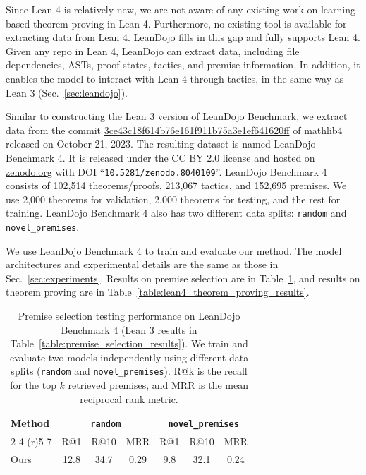 \documentclass{article}
\begin{document}
Since Lean 4 is relatively new, we are not aware of any existing work on learning-based theorem proving in Lean 4. Furthermore, no existing tool is available for extracting data from Lean 4. LeanDojo fills in this gap and fully supports Lean 4. Given any repo in Lean 4, LeanDojo can extract data, including file dependencies, ASTs, proof states, tactics, and premise information. In addition, it enables the model to interact with Lean 4 through tactics, in the same way as Lean 3 (Sec.~\ref{sec:leandojo}). 

Similar to constructing the Lean 3 version of LeanDojo Benchmark, we extract data from the commit \href{https://github.com/leanprover-community/mathlib4/commit/3ce43c18f614b76e161f911b75a3e1ef641620ff}{3ce43c18f614b76e161f911b75a3e1ef641620ff} of mathlib4 released on October 21, 2023. The resulting dataset is named LeanDojo Benchmark 4. It is released under the CC BY 2.0 license and hosted on \href{https://zenodo.org/}{zenodo.org} with DOI ``\texttt{10.5281/zenodo.8040109}''. LeanDojo Benchmark 4 consists of 102,514 theorems/proofs, 213,067 tactics, and 152,695 premises. We use 2,000 theorems for validation, 2,000 theorems for testing, and the rest for training. LeanDojo Benchmark 4 also has two different data splits: \texttt{random} and \texttt{novel\_premises}.

We use LeanDojo Benchmark 4 to train and evaluate our method. The model architectures and experimental details are the same as those in Sec.~\ref{sec:experiments}. Results on premise selection are in Table~\ref{table:lean4_premise_selection_results}, and results on theorem proving are in Table~\ref{table:lean4_theorem_proving_results}. 



\begin{table}[ht]
  \centering
  \caption{Premise selection testing performance on LeanDojo Benchmark 4 (Lean 3 results in  Table~\ref{table:premise_selection_results}). We train and evaluate two models independently using different data splits (\texttt{random} and \texttt{novel\_premises}). R@k is the recall for the top $k$ retrieved premises, and MRR is the mean reciprocal rank metric.}
  \begin{tabular}{@{}lcccccc@{}}
    \toprule
     Method & \multicolumn{3}{c}{\texttt{random}} & \multicolumn{3}{c}{\texttt{novel\_premises}} \\
     \cmidrule(r){2-4} \cmidrule(r){5-7} & R@1 & R@10 & MRR & R@1 & R@10 & MRR \\
    \midrule
    Ours & 12.8 & 34.7 & 0.29 & 9.8 & 32.1 & 0.24 \\
    \bottomrule
  \end{tabular}
  \label{table:lean4_premise_selection_results}
\end{table}
\end{document}
